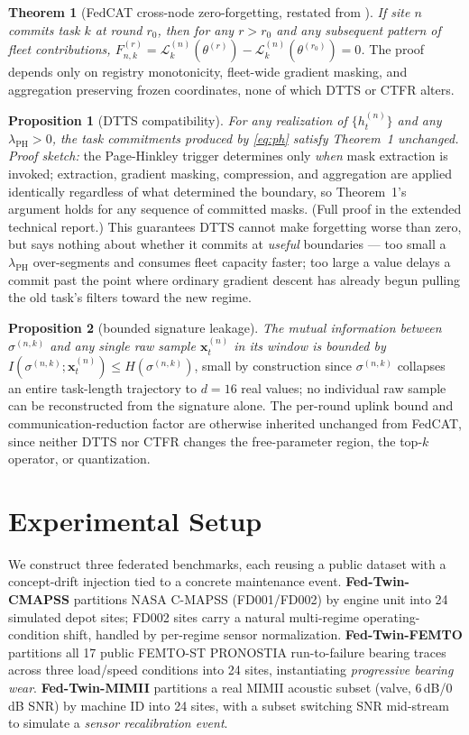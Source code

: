 \documentclass[journal]{IEEEtran}
\begin{document}
\textbf{Theorem 1} (FedCAT cross-node zero-forgetting, restated from \cite{fedcat2026}). \emph{If site $n$ commits task $k$ at round $r_0$, then for any $r>r_0$ and any subsequent pattern of fleet contributions, $F_{n,k}^{(r)} = \mathcal{L}_k^{(n)}(\theta^{(r)}) - \mathcal{L}_k^{(n)}(\theta^{(r_0)}) = 0$.} The proof depends only on registry monotonicity, fleet-wide gradient masking, and aggregation preserving frozen coordinates, none of which DTTS or CTFR alters.

\textbf{Proposition 1} (DTTS compatibility). \emph{For any realization of $\{h_t^{(n)}\}$ and any $\lambda_{\text{PH}}>0$, the task commitments produced by \eqref{eq:ph} satisfy Theorem~1 unchanged.} \emph{Proof sketch:} the Page-Hinkley trigger determines only \emph{when} mask extraction is invoked; extraction, gradient masking, compression, and aggregation are applied identically regardless of what determined the boundary, so Theorem~1's argument holds for any sequence of committed masks. (Full proof in the extended technical report.) This guarantees DTTS cannot make forgetting worse than zero, but says nothing about whether it commits at \emph{useful} boundaries — too small a $\lambda_{\text{PH}}$ over-segments and consumes fleet capacity faster; too large a value delays a commit past the point where ordinary gradient descent has already begun pulling the old task's filters toward the new regime.

\textbf{Proposition 2} (bounded signature leakage). \emph{The mutual information between $\sigma^{(n,k)}$ and any single raw sample $\mathbf{x}_t^{(n)}$ in its window is bounded by $I(\sigma^{(n,k)};\mathbf{x}_t^{(n)}) \le H(\sigma^{(n,k)})$}, small by construction since $\sigma^{(n,k)}$ collapses an entire task-length trajectory to $d=16$ real values; no individual raw sample can be reconstructed from the signature alone. The per-round uplink bound and communication-reduction factor are otherwise inherited unchanged from FedCAT, since neither DTTS nor CTFR changes the free-parameter region, the top-$k$ operator, or quantization.

\section{Experimental Setup}

We construct three federated benchmarks, each reusing a public dataset with a concept-drift injection tied to a concrete maintenance event. \textbf{Fed-Twin-CMAPSS} partitions NASA C-MAPSS \cite{saxena2008cmapss} (FD001/FD002) by engine unit into 24 simulated depot sites; FD002 sites carry a natural multi-regime operating-condition shift, handled by per-regime sensor normalization. \textbf{Fed-Twin-FEMTO} partitions all 17 public FEMTO-ST PRONOSTIA \cite{nectoux2012pronostia} run-to-failure bearing traces across three load/speed conditions into 24 sites, instantiating \emph{progressive bearing wear}. \textbf{Fed-Twin-MIMII} partitions a real MIMII \cite{purohit2019mimii} acoustic subset (valve, 6\,dB/0\,dB SNR) by machine ID into 24 sites, with a subset switching SNR mid-stream to simulate a \emph{sensor recalibration event}.
\end{document}
